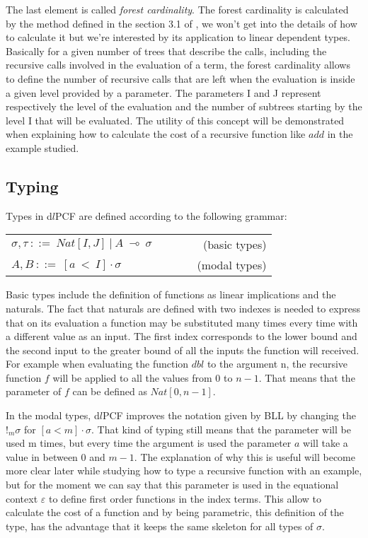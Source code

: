 \documentclass[a4paper,12pt]{article}
\begin{document}
The last element is called \emph{forest cardinality}. The forest
cardinality is calculated by the method defined in the section 3.1 of \cite{ldtcv}, we won't
get into the details of how to calculate it but we're interested by its application to 
linear dependent types. Basically for a given number of trees that describe the calls, including
the recursive calls involved in the evaluation of a term, the forest cardinality allows to
define the number of recursive calls that are left when the evaluation is inside a given
level provided by a parameter. The parameters I and J represent respectively the level of the 
evaluation and the number of subtrees starting by the level I that will be evaluated. The 
utility of this concept will be demonstrated when explaining how to calculate the cost of
a recursive function like $add$ in the example studied.


\subsection{Typing}

Types in d$l$PCF are defined according to the following grammar:

\begin{center}
  \begin{tabular}{l c r}
    $\sigma, \tau~::=~Nat[I,J]~|~A~\multimap~\sigma$ & ~~~~ & (basic types) \\
    $A, B~::=~[a~<~I] \cdot \sigma$ & ~~~~ & (modal types)
  \end{tabular}
\end{center}

Basic types include the definition of functions as linear implications
and the naturals. The fact that naturals are defined with two indexes
is needed to express that on its evaluation a function may be
substituted many times every time with a different value as an
input. The first index corresponds to the lower bound and the second
input to the greater bound of all the inputs the function will
received. For example when evaluating the function $dbl$ to the
argument n, the recursive function $f$ will be applied to all the
values from $0$ to $n-1$. That means that the parameter of $f$ can be
defined as $Nat[0,n-1]$.

In the modal types, d$l$PCF improves the notation given by BLL by changing the 
$!_{m}\sigma$ for $[a < m] \cdot \sigma$. That kind of typing still means that 
the parameter will be used m times, but every time the argument is used
the parameter $a$ will take a value in between 0 and $m-1$. The
explanation of why this is useful will become more clear later
while studying how to type a recursive function with an example, but 
for the moment we can say that this parameter is used in 
the equational context $\varepsilon$ to define first order functions
in the index terms. This allow to calculate the cost of a function and
by being parametric, this definition of the type, has the advantage
that it keeps the same skeleton for all types of $\sigma$.
\end{document}
